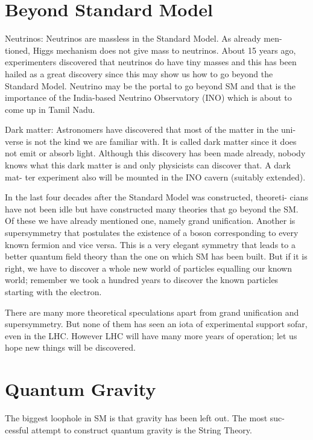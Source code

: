 \section*{Beyond Standard Model}


Neutrinos: Neutrinos are massless in the Standard Model. As already men-
tioned, Higgs mechanism does not give mass to neutrinos. About 15 years ago,
experimenters discovered that neutrinos do have tiny masses and this has been
hailed as a great discovery since this may show us how to go beyond the Standard
Model. Neutrino may be the portal to go beyond SM and that is the importance of
the India-based Neutrino Observatory (INO) which is about to come up in Tamil
Nadu.


Dark matter: Astronomers have discovered that most of the matter in the uni-
verse is not the kind we are familiar with. It is called dark matter since it does
not emit or absorb light. Although this discovery has been made already, nobody
knows what this dark matter is and only physicists can discover that. A dark mat-
ter experiment also will be mounted in the INO cavern (suitably extended).

In the last four decades after the Standard Model was constructed, theoreti-
cians have not been idle but have constructed many theories that go beyond the SM. Of these we have already mentioned one, namely grand unification. Another
is supersymmetry that postulates the existence of a boson corresponding to every
known fermion and vice versa. This is a very elegant symmetry that leads to a
better quantum field theory than the one on which SM has been built. But if it
is right, we have to discover a whole new world of particles equalling our known
world; remember we took a hundred years to discover the known particles starting
with the electron.


There are many more theoretical speculations apart from grand unification and
supersymmetry. But none of them has seen an iota of experimental support sofar,
even in the LHC. However LHC will have many more years of operation; let us
hope new things will be discovered.


\section*{Quantum Gravity}


The biggest loophole in SM is that gravity has been left out. The most suc-
cessful attempt to construct quantum gravity is the String Theory.


